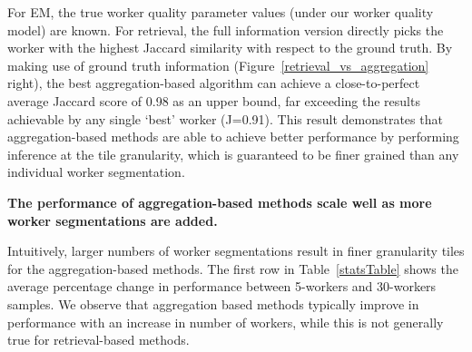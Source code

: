 \documentclass[letterpaper]{article}
\newcommand{\stitle}[1]{\noindent \textbf{#1}}
\begin{document}
For EM, %
the true worker quality parameter values (under our worker quality model) are known. For retrieval, the full information version directly picks the worker with the highest Jaccard similarity with respect to the ground truth. By making use of ground truth information (Figure~\ref{retrieval_vs_aggregation} right), the best aggregation-based algorithm can achieve a close-to-perfect average Jaccard score of 0.98 as an upper bound, far exceeding the results achievable by any single `best' worker (J=0.91). This result demonstrates that aggregation-based methods are able to achieve better performance by performing inference at the tile granularity, which is guaranteed to be finer grained than any individual worker segmentation. 

\stitle{The performance of aggregation-based methods scale well as more worker segmentations are added.}
\par \noindent Intuitively, larger numbers of worker segmentations result in finer granularity tiles for the aggregation-based methods. The first row in Table~\ref{statsTable} shows the average percentage change in performance between 5-workers and 30-workers samples. We observe that aggregation based methods typically improve in performance with an increase in number of workers, while this is not generally true for retrieval-based methods.
\end{document}
